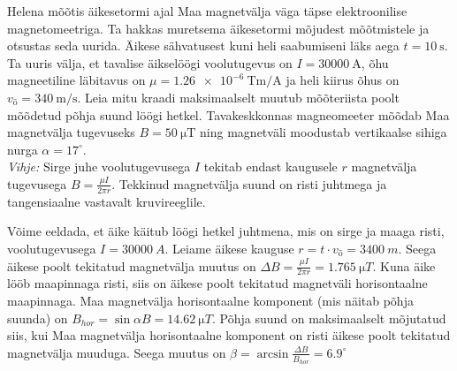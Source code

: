 
Helena mõõtis äikesetormi ajal Maa magnetvälja väga täpse elektroonilise magnetomeetriga. Ta hakkas muretsema äikesetormi mõjudest mõõtmistele ja otsustas seda uurida. Äikese sähvatusest kuni heli saabumiseni läks aega $t = \SI{10}{\s}$. Ta uuris välja, et tavalise äikselöögi voolutugevus on $I = \SI{30000}{\ampere}$, õhu magneetiline läbitavus on $\mu = \SI{1.26e-6}{\tesla\metre\per\ampere}$ ja heli kiirus õhus on $v_{õ} = \SI{340}{\m\per\s}$. Leia mitu kraadi maksimaalselt muutub mõõteriista poolt mõõdetud põhja suund löögi hetkel. Tavakeskkonnas magneomeeter mõõdab Maa magnetvälja tugevuseks $B = \SI{50}{\micro \tesla}$ ning magnetväli moodustab vertikaalse sihiga nurga $\alpha = 17^{\circ}$. \\
\textit{Vihje:} Sirge juhe voolutugevusega $I$ tekitab endast kaugusele $r$ magnetvälja tugevusega $B = \frac{\mu I}{2\pi r}$. Tekkinud magnetvälja suund on risti juhtmega ja tangensiaalne vastavalt kruvireeglile.





\hint

\solu
Võime eeldada, et äike käitub löögi hetkel juhtmena, mis on sirge ja maaga risti, voolutugevusega $I = \SI{30000}{A}$. Leiame äikese kauguse $r = t\cdot v_{õ} = \SI{3400}{m}$. Seega äikese poolt tekitatud magnetvälja muutus on $\Delta B = \frac{\mu I}{2\pi r} = \SI{1.765}{\micro T}$. Kuna äike lööb maapinnaga risti, siis on äikese poolt tekitatud magnetväli horisontaalne maapinnaga. Maa magnetvälja horisontaalne komponent (mis näitab põhja suunda) on $B_{hor} = \sin{\alpha}B = \SI{14.62}{\micro T}$. Põhja suund on maksimaalselt mõjutatud siis, kui Maa magnetvälja horisontaalne komponent on risti äikese poolt tekitatud magnetvälja muuduga. Seega muutus on $\beta = \arcsin{\frac{\Delta B}{B_{hor}}} = 6.9^{\circ}$
\probend